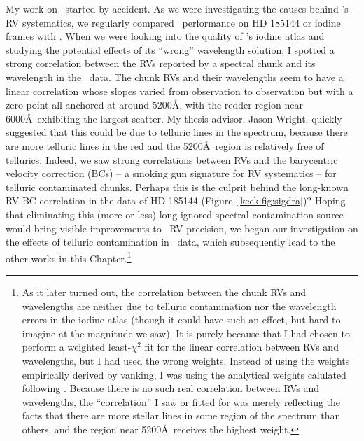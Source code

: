 My work on \keck\ started by accident. As we were investigating the
causes behind \het's RV systematics, we regularly compared \keck\
performance on HD 185144 or iodine frames with \het. When we were
looking into the quality of \het's iodine atlas and studying the
potential effects of its ``wrong'' wavelength solution, I spotted a
strong correlation between the RVs reported by a spectral chunk and
its wavelength in the \keck\ data. The chunk RVs and their wavelengths
seem to have a linear correlation whose slopes varied from observation
to observation but with a zero point all anchored at around 5200\AA,
with the redder region near 6000\AA\ exhibiting the largest
scatter. My thesis advisor, Jason Wright, quickly suggested that this
could be due to telluric lines in the spectrum, because there are more
telluric lines in the red and the 5200\AA\ region is relatively free
of tellurics. Indeed, we saw strong correlations between RVs and the
barycentric velocity correction (BCs) -- a smoking gun signature for
RV systematics -- for telluric contaminated chunks. Perhaps this is
the culprit behind the long-known RV-BC correlation in the data of HD
185144 (Figure~\ref{keck:fig:sigdra})? Hoping that eliminating this
(more or less) long ignored spectral contamination source would bring
visible improvements to \keck\ RV precision, we began our
investigation on the effects of telluric contamination in \keck\ data,
which subsequently lead to the other works in this
Chapter.\footnote{As it later turned out, the correlation between the
chunk RVs and wavelengths are neither due to telluric contamination
nor the wavelength errors in the iodine atlas (though it could have
such an effect, but hard to imagine at the magnitude we saw). It is
purely because that I had chosen to perform a weighted least-$\chi^2$
fit for the linear correlation between RVs and wavelengths, but I had
used the wrong weights. Instead of using the weights empirically
derived by vanking, I was using the analytical weights calulated
following \cite{butler1996}. Because there is no such real
correlation between RVs and wavelengths, the ``correlation'' I saw or
fitted for was merely reflecting the facts that there are more stellar
lines in some region of the spectrum than others, and the region near
5200\AA\ receives the highest weight.}
 
